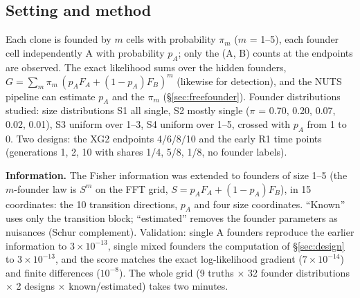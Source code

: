 \documentclass[10pt,a4paper]{article}
\begin{document}
\subsection{Setting and method}
Each clone is founded by $m$ cells with probability $\pi_m$ ($m$ = 1--5), each founder cell independently A with probability $p_A$; only the (A, B) counts at the endpoints are observed. The exact likelihood sums over the hidden founders, $G = \sum_m \pi_m\,(p_A F_A + (1-p_A) F_B)^m$ (likewise for detection), and the NUTS pipeline can estimate $p_A$ and the $\pi_m$ (\S\ref{sec:freefounder}). Founder distributions studied: size distributions S1 all single, S2 mostly single ($\pi$ = 0.70, 0.20, 0.07, 0.02, 0.01), S3 uniform over 1--3, S4 uniform over 1--5, crossed with $p_A$ from 1 to 0. Two designs: the XG2 endpoints 4/6/8/10 and the early R1 time points (generations 1, 2, 10 with shares 1/4, 5/8, 1/8, no founder labels).

\textbf{Information.} The Fisher information was extended to founders of size 1--5 (the $m$-founder law is $S^m$ on the FFT grid, $S = p_A F_A + (1-p_A)F_B$), in 15 coordinates: the 10 transition directions, $p_A$ and four size coordinates. ``Known'' uses only the transition block; ``estimated'' removes the founder parameters as nuisances (Schur complement). Validation: single A founders reproduce the earlier information to $3\times10^{-13}$, single mixed founders the computation of \S\ref{sec:design} to $3\times10^{-13}$, and the score matches the exact log-likelihood gradient ($7\times10^{-14}$) and finite differences ($10^{-8}$). The whole grid (9 truths $\times$ 32 founder distributions $\times$ 2 designs $\times$ known/estimated) takes two minutes.
\end{document}
